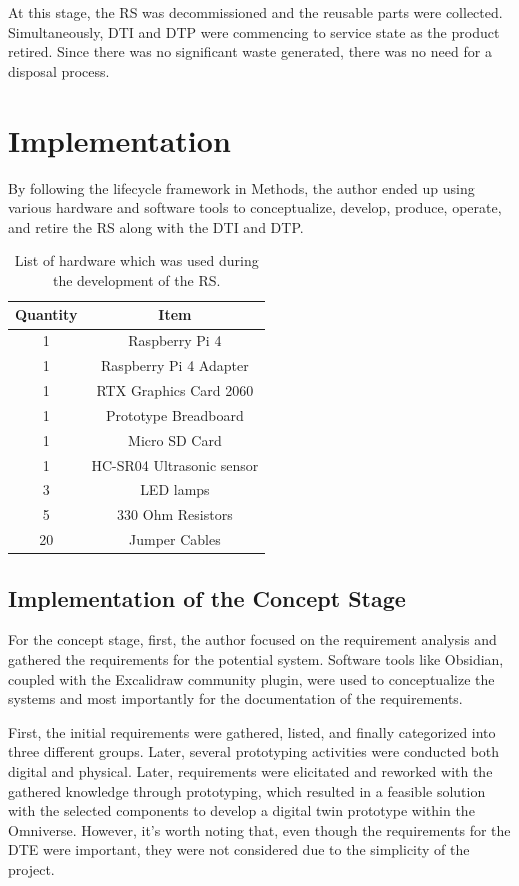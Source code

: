 \documentclass[conference]{IEEEtran}
\begin{document}
    At this stage, the RS was decommissioned and the reusable parts were collected. Simultaneously, DTI and DTP were commencing to service state as the product retired. 
    Since there was no significant waste generated, there was no need for a disposal process.   

   
    \section{Implementation}\label{section:implementation}

    By following the lifecycle framework in Methods, the author ended up using various hardware and software tools to conceptualize, 
    develop, produce, operate, and retire the RS along with the DTI and DTP.
    
    \begin{table}
        \centering
        \caption{List of hardware which was used during the development of the RS.}
        \begin{tabular}{|c|c|}
        \hline
        \textbf{Quantity} & \textbf{Item} \\
        \hline
        1 & Raspberry Pi 4 \\
        1 & Raspberry Pi 4 Adapter \\
        1 & RTX Graphics Card 2060 \\
        1 & Prototype Breadboard \\
        1 & Micro SD Card \\
        1 & HC-SR04 Ultrasonic sensor \\
        3 & LED lamps \\
        5 & 330 Ohm Resistors \\
        20 & Jumper Cables \\
        \hline
        \end{tabular}
        \end{table}

    \subsection{Implementation of the Concept Stage}
    For the concept stage, first, the author focused on the requirement analysis and gathered the requirements for the potential system. Software tools like Obsidian, coupled with the Excalidraw community plugin, 
    were used to conceptualize the systems and most importantly for the documentation of the requirements.   

    First, the initial requirements were gathered, listed, and finally categorized into three different groups.  Later, several prototyping activities were conducted both digital and physical. 
    Later, requirements were elicitated and reworked with the gathered knowledge through prototyping, which resulted in a feasible solution with the selected components to develop a digital twin 
    prototype within the Omniverse. However, it's worth noting that, 
    even though the requirements for the DTE were important, they were not considered due to the simplicity of the project. 
    
\end{document}
